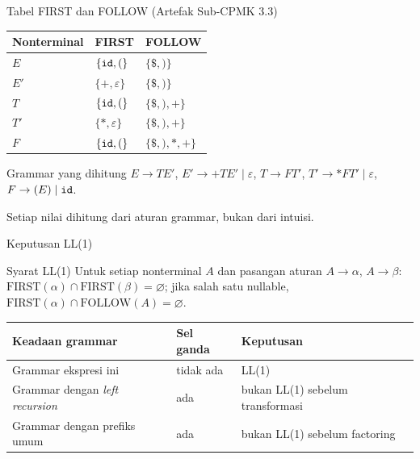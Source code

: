 \documentclass[aspectratio=169,10pt,t]{beamer}
\begin{document}
\begin{frame}{Tabel FIRST dan FOLLOW (Artefak Sub-CPMK 3.3)}
  \small
  \setlength{\tabcolsep}{6pt}
  \begin{tabular}{@{}l l l@{}}
    \toprule
    \textbf{Nonterminal} & \textbf{FIRST} & \textbf{FOLLOW} \\
    \midrule
    \(E\)  & \(\{\texttt{id}, (\}\) & \(\{\$, )\}\) \\
    \(E'\) & \(\{+, \varepsilon\}\) & \(\{\$, )\}\) \\
    \(T\)  & \(\{\texttt{id}, (\}\) & \(\{\$, ), +\}\) \\
    \(T'\) & \(\{*, \varepsilon\}\) & \(\{\$, ), +\}\) \\
    \(F\)  & \(\{\texttt{id}, (\}\) & \(\{\$, ), *, +\}\) \\
    \bottomrule
  \end{tabular}

  \vspace{6pt}
  \begin{block}{Grammar yang dihitung}
    \footnotesize
    \(E \to TE'\), \(E' \to +TE' \mid \varepsilon\),
    \(T \to FT'\), \(T' \to *FT' \mid \varepsilon\),
    \(F \to (E) \mid \texttt{id}\).
  \end{block}

  \vspace{2pt}
  {\footnotesize\color{ubbblue!80}Setiap nilai dihitung dari aturan
  grammar, bukan dari intuisi.}
\end{frame}

\begin{frame}{Keputusan LL(1)}
  \begin{block}{Syarat LL(1)}
    \small
    Untuk setiap nonterminal \(A\) dan pasangan aturan
    \(A \to \alpha\), \(A \to \beta\):
    \(\text{FIRST}(\alpha) \cap \text{FIRST}(\beta)=\varnothing\); jika
    salah satu nullable,
    \(\text{FIRST}(\alpha) \cap \text{FOLLOW}(A)=\varnothing\).
  \end{block}

  \small
  \setlength{\tabcolsep}{4pt}
  \begin{tabular}{@{}p{5.4cm}p{2.4cm}p{5.4cm}@{}}
    \toprule
    \textbf{Keadaan grammar} & \textbf{Sel ganda} & \textbf{Keputusan} \\
    \midrule
    Grammar ekspresi ini & tidak ada & LL(1) \\
    Grammar dengan \textit{left recursion} & ada &
      bukan LL(1) sebelum transformasi \\
    Grammar dengan prefiks umum & ada &
      bukan LL(1) sebelum factoring \\
    \bottomrule
  \end{tabular}
\end{frame}
\end{document}
